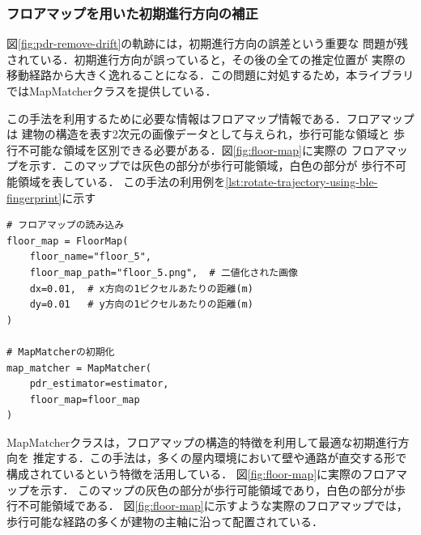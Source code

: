 

\subsubsection{フロアマップを用いた初期進行方向の補正}

図\ref{fig:pdr-remove-drift}の軌跡には，初期進行方向の誤差という重要な
問題が残されている．初期進行方向が誤っていると，その後の全ての推定位置が
実際の移動経路から大きく逸れることになる．この問題に対処するため，本ライブラリ
ではMapMatcherクラスを提供している．

この手法を利用するために必要な情報はフロアマップ情報である．フロアマップは
建物の構造を表す2次元の画像データとして与えられ，歩行可能な領域と
歩行不可能な領域を区別できる必要がある．図\ref{fig:floor-map}に実際の
フロアマップを示す．このマップでは灰色の部分が歩行可能領域，白色の部分が
歩行不可能領域を表している．
この手法の利用例を\ref{lst:rotate-trajectory-using-ble-fingerprint}に示す


\begin{lstlisting}[caption={MapMatcherの使用例},label=lst:rotate-trajectory-using-ble-fingerprint,float=ht]
# フロアマップの読み込み
floor_map = FloorMap(
    floor_name="floor_5",
    floor_map_path="floor_5.png",  # 二値化された画像
    dx=0.01,  # x方向の1ピクセルあたりの距離(m)
    dy=0.01   # y方向の1ピクセルあたりの距離(m)
)

# MapMatcherの初期化
map_matcher = MapMatcher(
    pdr_estimator=estimator,
    floor_map=floor_map
)
\end{lstlisting}

MapMatcherクラスは，フロアマップの構造的特徴を利用して最適な初期進行方向を
推定する．この手法は，多くの屋内環境において壁や通路が直交する形で構成されているという特徴を活用している．
図\ref{fig:floor-map}に実際のフロアマップを示す．
このマップの灰色の部分が歩行可能領域であり，白色の部分が歩行不可能領域である．
図\ref{fig:floor-map}に示すような実際のフロアマップでは，
歩行可能な経路の多くが建物の主軸に沿って配置されている．

